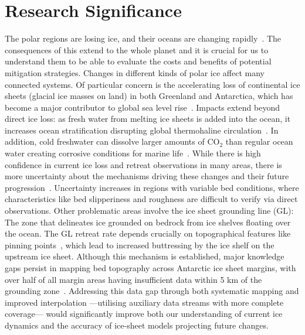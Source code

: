 \section{Research Significance}
The polar regions are losing ice, and their oceans are changing rapidly~\cite{O_C_in_changingClimate}. The consequences of this extend to the whole planet and it is crucial for us to understand them to be able to evaluate the costs and benefits of potential mitigation strategies. 
Changes in different kinds of polar ice affect many connected systems. Of particular concern is the accelerating loss of continental ice sheets (glacial ice masses on land) in both Greenland and Antarctica, which has become a major contributor to global sea level rise~\cite{O_C_in_changingClimate}. Impacts extend beyond direct ice loss: as fresh water from melting ice sheets is added into the ocean, it increases ocean stratification disrupting global thermohaline circulation~\cite{Jacobs_2004}. In addition, cold freshwater can dissolve larger amounts of $\mathrm{CO_2}$ than regular ocean water creating corrosive conditions for marine life~\cite{O_C_in_changingClimate}.
While there is high confidence in current ice loss and retreat observations in many areas, there is more uncertainty about the mechanisms driving these changes and their future progression~\cite{Fox-Kemper_2021}. Uncertainty increases in regions with variable bed conditions, where characteristics like bed slipperiness and roughness are difficult to verify via direct observations. Other problematic areas involve the ice sheet grounding line (GL): The zone that delineates ice grounded on bedrock from ice shelves floating over the ocean. The GL retreat rate depends crucially on topographical features like pinning points~\cite{Fox-Kemper_2021}, which lead to increased buttressing by the ice shelf on the upstream ice sheet. Although this mechanism is established, major knowledge gaps persist in mapping bed topography across Antarctic ice sheet margins, with over half of all margin areas having insufficient data within 5 km of the grounding zone~\cite{RINGS_2022}. Addressing this data gap through both systematic mapping and improved interpolation —utilising auxiliary data streams with more complete coverage— would significantly improve both our understanding of current ice dynamics and the accuracy of ice-sheet models projecting future changes.

